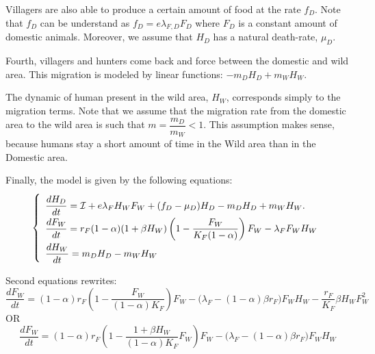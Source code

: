\documentclass{article}
\newcommand{\lfw}{\lambda_{F}}
\newcommand{\lfd}{\lambda_{F, D}}
\newcommand{\lfw}{\lambda_{F}}
\newcommand{\cI}{\mathcal{I}}
\begin{document}
Villagers are also able to produce a certain amount of food at the rate $f_D$. Note that $f_D$ can be understand as $f_D = e \lfd F_D$ where $F_D$ is a constant amount of domestic animals.
Moreover, we assume that $H_D$ has a natural death-rate, $\mu_D$.

Fourth, villagers and hunters come back and force between the domestic and wild area. This migration is modeled by linear functions: $-m_D H_D + m_W H_W$.

The dynamic of human present in the wild area, $H_W$, corresponds simply to the migration terms. Note that we assume that the migration rate from the domestic area to the wild area is such that $m = \dfrac{m_D}{m_W} < 1$. This assumption makes sense, because humans stay a short amount of time in the Wild area than in the Domestic area.

Finally, the model is given by the following equations:
\begin{equation}
\def\arraystretch{2}
\left\{ 
\begin{array}{l}
\dfrac{dH_D}{dt}= \cI + e\lfw H_W F_W + (f_D - \mu_D) H_D - m_D H_D + m_W H_W. \\
\dfrac{dF_W}{dt} = r_F(1- \alpha) (1+ \beta H_W) \left(1 - \dfrac{F_W}{K_F(1-\alpha)} \right) F_W - \lfw F_W H_W \\
\dfrac{dH_W}{dt}= m_D H_D - m_W H_W 
\end{array} \right.
\label{equationsHDFWHW}
\end{equation}


Second equations rewrites:
$$
\dfrac{dF_W}{dt} = (1- \alpha)r_F \left(1 - \dfrac{F_W}{(1-\alpha)K_F} \right) F_W - \Big(\lfw - (1-\alpha) \beta r_F\Big) F_W H_W - \dfrac{r_F}{K_F} \beta H_W F_W^2
$$
OR
$$
\dfrac{dF_W}{dt} = (1- \alpha)r_F \left(1 - \dfrac{1 + \beta H_W}{(1-\alpha)K_F}F_W \right) F_W - \Big(\lfw - (1-\alpha) \beta r_F\Big) F_W H_W
$$
\end{document}
